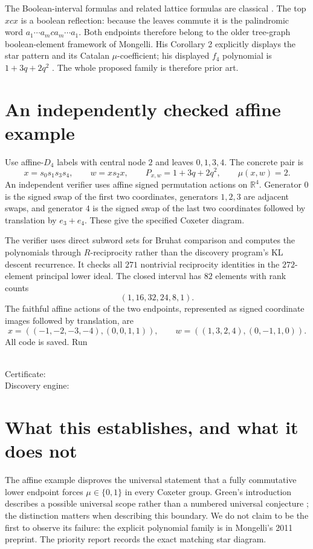 \documentclass[11pt]{article}
\begin{document}
The Boolean-interval formulas and related lattice formulas are classical
\cite{Brenti}. The top $xcx$ is a boolean reflection: because the leaves
commute it is the palindromic word $a_1\cdots a_mca_m\cdots a_1$.
Both endpoints therefore belong to the older tree-graph boolean-element
framework of Mongelli. His Corollary 2 explicitly displays the star pattern
and its Catalan $\mu$-coefficient; his displayed $f_4$ polynomial is
$1+3q+2q^2$ \cite[Corollary 2 (arXiv v1, p.~10); $f_4$ on p.~6]{Mongelli}.
The whole proposed family is therefore prior art.

\section{An independently checked affine example}
Use affine-$D_4$ labels with central node $2$ and leaves $0,1,3,4$.
The concrete pair is
\[
 x=s_0s_1s_3s_4,\qquad w=xs_2x,
 \qquad P_{x,w}=1+3q+2q^2,\qquad\mu(x,w)=2.
\]
An independent verifier uses affine signed permutation actions on
$\mathbb R^4$. Generator $0$ is the signed swap of the first two
coordinates, generators $1,2,3$ are adjacent swaps, and generator $4$
is the signed swap of the last two coordinates followed by translation
by $e_3+e_4$. These give the specified Coxeter diagram.

The verifier uses direct subword sets for Bruhat comparison and computes
the polynomials through $R$-reciprocity rather than the discovery program's
KL descent recurrence. It checks all $271$ nontrivial reciprocity identities
in the $272$-element principal lower ideal. The closed interval has $82$
elements with rank counts
\[
 (1,16,32,24,8,1).
\]
The faithful affine actions of the two endpoints, represented as signed
coordinate images followed by translation, are
\[
 x=((-1,-2,-3,-4),(0,0,1,1)),\qquad
 w=((1,3,2,4),(0,-1,1,0)).
\]
All code is saved. Run
\begin{flushleft}\small
{}\\
Certificate: \\
Discovery engine: 
\end{flushleft}

\section{What this establishes, and what it does not}
The affine example disproves the universal statement that a fully
commutative lower endpoint forces $\mu\in\{0,1\}$ in every Coxeter group.
Green's introduction describes a possible universal scope rather than a
numbered universal conjecture \cite[printed pp.2--3]{Green}; the distinction
matters when describing this boundary. We do not claim to be the first to
observe its failure: the explicit polynomial family is in Mongelli's 2011
preprint. The priority report records the exact matching star diagram.
\end{document}
